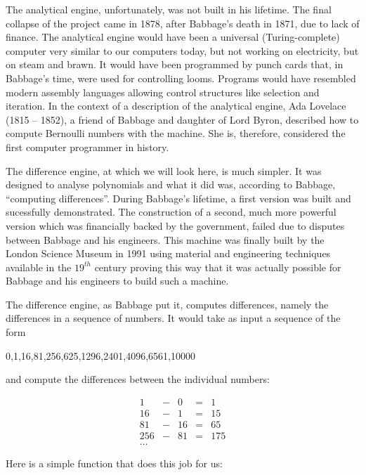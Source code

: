\documentclass[tikz]{scrreprt}
\begin{document}
The analytical engine, unfortunately, was not built in his lifetime.
The final collapse of the project came 
in 1878, after Babbage's death in 1871, 
due to lack of finance. 
The analytical engine would have been 
a universal (Turing-complete) computer
very similar to our computers today,
but not working on electricity, but on steam and brawn.
It would have been programmed by punch cards that,
in Babbage's time, were used for controlling looms.
Programs would have resembled modern assembly languages
allowing control structures like selection and iteration.
In the context of a description of the analytical engine,
Ada Lovelace (1815 -- 1852), 
a friend of Babbage and daughter of Lord Byron,
described how to compute Bernoulli numbers with the machine.
She is, therefore, considered the first computer programmer
in history.

The difference engine, at which we will look here,
is much simpler. It was designed to analyse polynomials
and what it did was, according to Babbage, ``computing differences''.
During Babbage's lifetime, a first version was built and
sucessfully demonstrated. The construction
of a second, much more powerful version
which was financially backed by the government,
failed due to disputes between Babbage and his engineers.
This machine was finally built by the London Science Museum
in 1991 using material and engineering techniques available
in the $19^{th}$ century proving this way
that it was actually possible for Babbage and his engineers
to build such a machine.

The difference engine, as Babbage put it, computes differences,
namely the differences in a sequence of numbers.
It would take as input a sequence of the form

0,1,16,81,256,625,1296,2401,4096,6561,10000

and compute the differences between the individual numbers:

\begin{equation}
\begin{array}{rcrcr}
  1 & - &  0 & = &   1 \\
 16 & - &  1 & = &  15 \\
 81 & - & 16 & = &  65 \\
256 & - & 81 & = & 175\\
\dots
\end{array}
\end{equation}

Here is a simple function that does this job for us:
\end{document}
